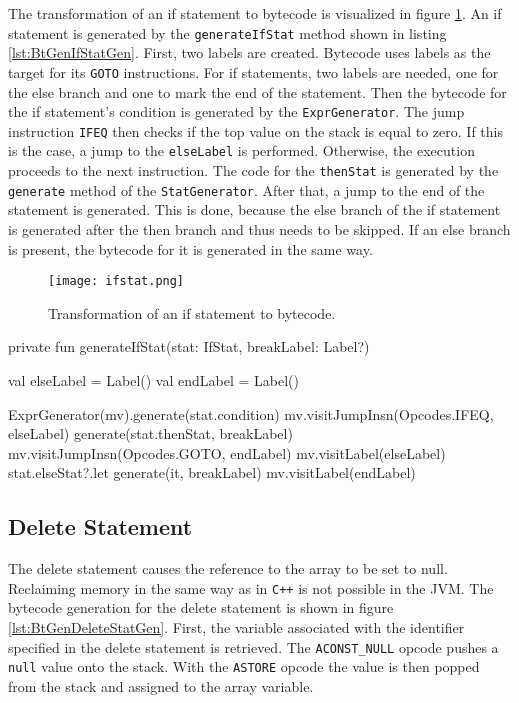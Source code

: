 The transformation of an if statement to bytecode is visualized in figure \ref{fig:IfStat}. An if statement is generated by the \verb|generateIfStat| method shown in listing \ref{lst:BtGenIfStatGen}. First, two labels are created. Bytecode uses labels as the target for its \verb|GOTO| instructions. For if statements, two labels are needed, one for the else branch and one to mark the end of the statement. Then the bytecode for the if statement's condition is generated by the \verb|ExprGenerator|. The jump instruction \verb|IFEQ| then checks if the top value on the stack is equal to zero. If this is the case, a jump to the \verb|elseLabel| is performed. Otherwise, the execution proceeds to the next instruction. The code for the \verb|thenStat| is generated by the \verb|generate| method of the \verb|StatGenerator|. After that, a jump to the end of the statement is generated. This is done, because the else branch of the if statement is generated after the then branch and thus needs to be skipped. If an else branch is present, the bytecode for it is generated in the same way.


\begin{figure}[]
    \centering
    \texttt{[image: ifstat.png]}
    \caption{Transformation of an if statement to bytecode.}
    \label{fig:IfStat}
\end{figure}


\begin{KotlinCode}[float,numbers=none,caption=Implementation of the \texttt{generateIfStat} method of the \texttt{StatGenerator}., label=lst:BtGenIfStatGen]
private fun generateIfStat(stat: IfStat, breakLabel: Label?) {
    val elseLabel = Label()
    val endLabel = Label()

    ExprGenerator(mv).generate(stat.condition)
    mv.visitJumpInsn(Opcodes.IFEQ, elseLabel)
    generate(stat.thenStat, breakLabel)
    mv.visitJumpInsn(Opcodes.GOTO, endLabel)
    mv.visitLabel(elseLabel)
    stat.elseStat?.let { generate(it, breakLabel) }
    mv.visitLabel(endLabel)
}
\end{KotlinCode}

\subsection{Delete Statement}

The delete statement causes the reference to the array to be set to null. Reclaiming memory in the same way as in \verb|C++| is not possible in the JVM. The bytecode generation for the delete statement is shown in figure \ref{lst:BtGenDeleteStatGen}. First, the variable associated with the identifier specified in the delete statement is retrieved. The \verb|ACONST_NULL| opcode pushes a \verb|null| value onto the stack. With the \verb|ASTORE| opcode the value is then popped from the stack and assigned to the array variable. 


